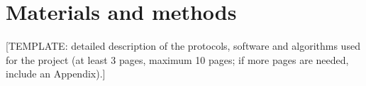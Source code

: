 \chapter{Materials and methods}

[TEMPLATE: detailed description of the protocols, software and algorithms used for the project (at least 3 pages, maximum 10 pages; if more pages are needed, include an Appendix).]